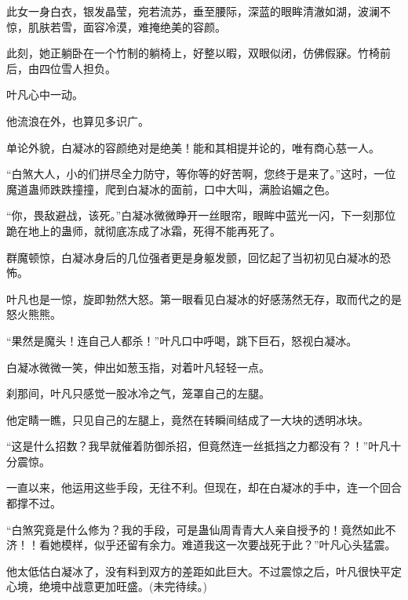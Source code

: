 \begin{this_body}
此女一身白衣，银发晶莹，宛若流苏，垂至腰际，深蓝的眼眸清澈如湖，波澜不惊，肌肤若雪，面容冷漠，难掩绝美的容颜。

此刻，她正躺卧在一个竹制的躺椅上，好整以暇，双眼似闭，仿佛假寐。竹椅前后，由四位雪人担负。

叶凡心中一动。

他流浪在外，也算见多识广。

单论外貌，白凝冰的容颜绝对是绝美！能和其相提并论的，唯有商心慈一人。

“白煞大人，小的们拼尽全力防守，等你等的好苦啊，您终于是来了。”这时，一位魔道蛊师跌跌撞撞，爬到白凝冰的面前，口中大叫，满脸谄媚之色。

“你，畏敌避战，该死。”白凝冰微微睁开一丝眼帘，眼眸中蓝光一闪，下一刻那位跪在地上的蛊师，就彻底冻成了冰霜，死得不能再死了。

群魔顿惊，白凝冰身后的几位强者更是身躯发颤，回忆起了当初初见白凝冰的恐怖。

叶凡也是一惊，旋即勃然大怒。第一眼看见白凝冰的好感荡然无存，取而代之的是怒火熊熊。

“果然是魔头！连自己人都杀！”叶凡口中呼喝，跳下巨石，怒视白凝冰。

白凝冰微微一笑，伸出如葱玉指，对着叶凡轻轻一点。

刹那间，叶凡只感觉一股冰冷之气，笼罩自己的左腿。

他定睛一瞧，只见自己的左腿上，竟然在转瞬间结成了一大块的透明冰块。

“这是什么招数？我早就催着防御杀招，但竟然连一丝抵挡之力都没有？！”叶凡十分震惊。

一直以来，他运用这些手段，无往不利。但现在，却在白凝冰的手中，连一个回合都撑不过。

“白煞究竟是什么修为？我的手段，可是蛊仙周青青大人亲自授予的！竟然如此不济！！看她模样，似乎还留有余力。难道我这一次要战死于此？”叶凡心头猛震。

他太低估白凝冰了，没有料到双方的差距如此巨大。不过震惊之后，叶凡很快平定心境，绝境中战意更加旺盛。(未完待续。)

\end{this_body}

